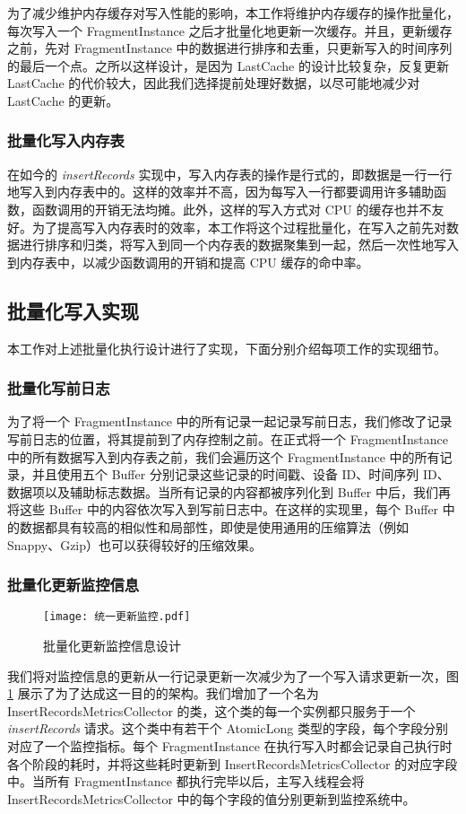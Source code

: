 为了减少维护内存缓存对写入性能的影响，本工作将维护内存缓存的操作批量化，每次写入一个 FragmentInstance 之后才批量化地更新一次缓存。并且，更新缓存之前，先对 FragmentInstance 中的数据进行排序和去重，只更新写入的时间序列的最后一个点。之所以这样设计，是因为 LastCache 的设计比较复杂，反复更新 LastCache 的代价较大，因此我们选择提前处理好数据，以尽可能地减少对 LastCache 的更新。
\subsubsection{批量化写入内存表}
在如今的 \emph{insertRecords} 实现中，写入内存表的操作是行式的，即数据是一行一行地写入到内存表中的。这样的效率并不高，因为每写入一行都要调用许多辅助函数，函数调用的开销无法均摊。此外，这样的写入方式对 CPU 的缓存也并不友好\cite{boncz2005monetdb}。为了提高写入内存表时的效率，本工作将这个过程批量化，在写入之前先对数据进行排序和归类，将写入到同一个内存表的数据聚集到一起，然后一次性地写入到内存表中，以减少函数调用的开销和提高 CPU 缓存的命中率。

\subsection{批量化写入实现}
本工作对上述批量化执行设计进行了实现，下面分别介绍每项工作的实现细节。
\subsubsection{批量化写前日志}
为了将一个 FragmentInstance 中的所有记录一起记录写前日志，我们修改了记录写前日志的位置，将其提前到了内存控制之前。在正式将一个 FragmentInstance 中的所有数据写入到内存表之前，我们会遍历这个 FragmentInstance 中的所有记录，并且使用五个 Buffer 分别记录这些记录的时间戳、设备 ID、时间序列 ID、数据项以及辅助标志数据。当所有记录的内容都被序列化到 Buffer 中后，我们再将这些 Buffer 中的内容依次写入到写前日志中。在这样的实现里，每个 Buffer 中的数据都具有较高的相似性和局部性，即使是使用通用的压缩算法（例如 Snappy、Gzip）也可以获得较好的压缩效果。
\subsubsection{批量化更新监控信息}
\begin{figure}
  \centering
  \texttt{[image: 统一更新监控.pdf]}
  \caption{批量化更新监控信息设计}
  \label{fig:batch-update-monitor}
\end{figure}
我们将对监控信息的更新从一行记录更新一次减少为了一个写入请求更新一次，图 \ref{fig:batch-update-monitor} 展示了为了达成这一目的的架构。我们增加了一个名为 InsertRecordsMetricsCollector 的类，这个类的每一个实例都只服务于一个 \emph{insertRecords} 请求。这个类中有若干个 AtomicLong 类型的字段，每个字段分别对应了一个监控指标。每个 FragmentInstance 在执行写入时都会记录自己执行时各个阶段的耗时，并将这些耗时更新到 InsertRecordsMetricsCollector 的对应字段中。当所有 FragmentInstance 都执行完毕以后，主写入线程会将 InsertRecordsMetricsCollector 中的每个字段的值分别更新到监控系统中。

